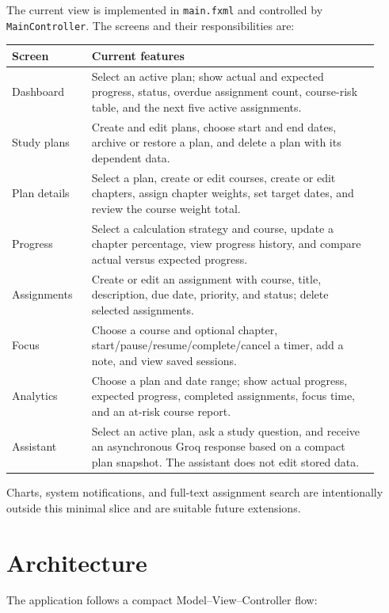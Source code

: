 \documentclass[11pt,a4paper]{article}
\newcommand{\code}[1]{\texttt{#1}}
\begin{document}
The current view is implemented in \code{main.fxml} and controlled by \code{MainController}. The screens and their responsibilities are:

\begin{longtable}{@{}L{0.20\linewidth}L{0.72\linewidth}@{}}
\toprule
\textbf{Screen} & \textbf{Current features}\\
\midrule
\endhead
Dashboard & Select an active plan; show actual and expected progress, status, overdue assignment count, course-risk table, and the next five active assignments.\\
Study plans & Create and edit plans, choose start and end dates, archive or restore a plan, and delete a plan with its dependent data.\\
Plan details & Select a plan, create or edit courses, create or edit chapters, assign chapter weights, set target dates, and review the course weight total.\\
Progress & Select a calculation strategy and course, update a chapter percentage, view progress history, and compare actual versus expected progress.\\
Assignments & Create or edit an assignment with course, title, description, due date, priority, and status; delete selected assignments.\\
Focus & Choose a course and optional chapter, start/pause/resume/complete/cancel a timer, add a note, and view saved sessions.\\
Analytics & Choose a plan and date range; show actual progress, expected progress, completed assignments, focus time, and an at-risk course report.\\
Assistant & Select an active plan, ask a study question, and receive an asynchronous Groq response based on a compact plan snapshot. The assistant does not edit stored data.\\
\bottomrule
\end{longtable}

Charts, system notifications, and full-text assignment search are intentionally outside this minimal slice and are suitable future extensions.

\section{Architecture}

The application follows a compact Model--View--Controller flow:
\end{document}
